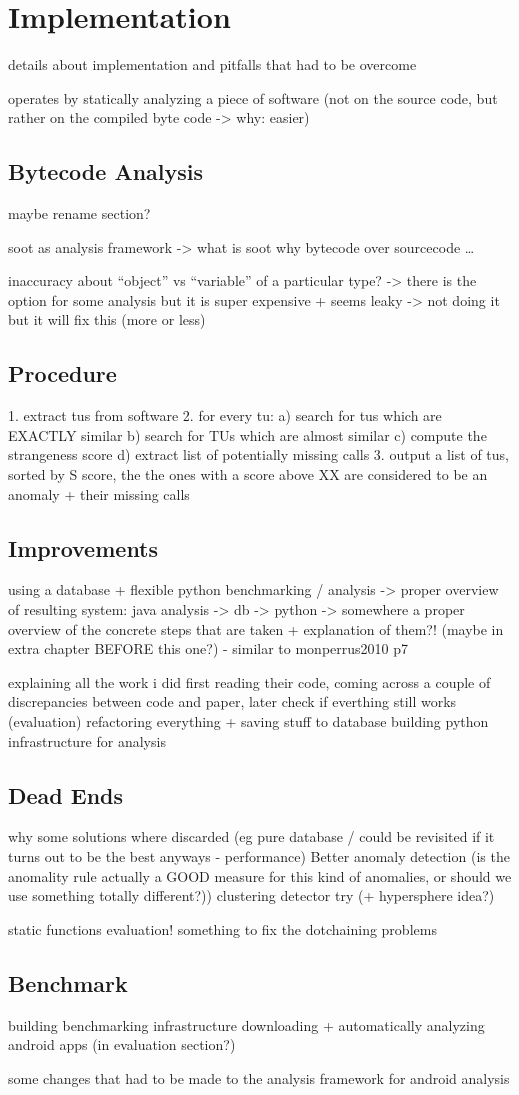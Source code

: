 \chapter{Implementation}
details about implementation and pitfalls that had to be overcome

operates by statically analyzing a piece of software
(not on the source code, but rather on the compiled byte code -> why: easier)

\section{Bytecode Analysis}\label{sec:bytecode}
maybe rename section?

soot as analysis framework -> what is soot
why bytecode over sourcecode
\ldots

inaccuracy about ``object'' vs ``variable'' of a particular type?
-> there is the option for some analysis but it is super  expensive + seems leaky -> not doing it
but it will fix this (more or less)

\section{Procedure}

1. extract tus from software
2. for every tu:
    a) search for tus which are EXACTLY similar
    b) search for TUs which are almost similar
    c) compute the strangeness score
    d) extract list of potentially missing calls
3. output a list of tus, sorted by S score, the the ones with a score above XX are considered to be an anomaly + their missing calls

\section{Improvements}
using a database + flexible python benchmarking / analysis
-> proper overview of resulting system: java analysis -> db -> python
-> somewhere a proper overview of the concrete steps that are taken + explanation of them?! (maybe in extra chapter BEFORE this one?) - similar to monperrus2010 p7

explaining all the work i did
    first reading their code, coming across a couple of discrepancies between code and paper, later check if everthing still works (evaluation)
    refactoring everything + saving stuff to database
    building python infrastructure for analysis

\section{Dead Ends}
why some solutions where discarded (eg pure database / could be revisited if it turns out to be the best anyways - performance)
Better anomaly detection (is the anomality rule actually a GOOD measure for this kind of anomalies, or should we use something totally different?))
    clustering detector try (+ hypersphere idea?)

static functions evaluation!
something to fix the dotchaining problems

\section{Benchmark}

building benchmarking infrastructure
downloading + automatically analyzing android apps (in evaluation section?)

some changes that had to be made to the analysis framework for android analysis
